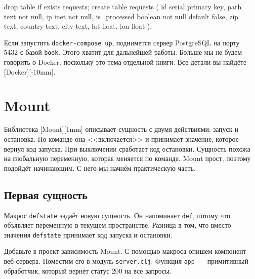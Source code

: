 \else

\begin{english}
  \begin{sql}
drop table if exists requests;
create table requests (
    id            serial primary key,
    path          text not null,
    ip            inet not null,
    is_processed  boolean not null default false,
    zip           text,
    country       text,
    city          text,
    lat           float,
    lon           float
);
  \end{sql}
\end{english}

\fi

Если запустить \verb|docker-compose up|, поднимется сервер PostgreSQL на порту
5432 с базой \verb|book|. Этого хватит для дальнейшей работы. Больше мы не
будем говорить о Docker, поскольку это тема отдельной книги. Все детали вы
найдёте [Docker][-10mm].

\section{Mount}


Библиотека [Mount][1mm]
описывает сущность с двумя действиями: запуск и остановка. По команде она
<<включается>> и принимает значение, которое вернул код запуска. При выключении
сработает код остановки. Сущность похожа на глобальную переменную, которая
меняется по команде. Mount прост, поэтому подойдёт начинающим. С него мы начнём
практическую часть.

\subsection{Первая сущность}


Макрос \verb|defstate| задаёт новую сущность. Он напоминает \verb|def|,
потому что объявляет переменную в текущем пространстве. Разница в том, что
вместо значения \verb|defstate| принимает код запуска и остановки.

Добавьте в проект зависимость Mount. С помощью макроса опишем компонент
веб-сервера. Поместим его в модуль \verb|server.clj|. Функция \verb|app|~---
примитивный обработчик, который вернёт статус 200 на все запросы.

\ifx\DEVICETYPE\MOBILE

